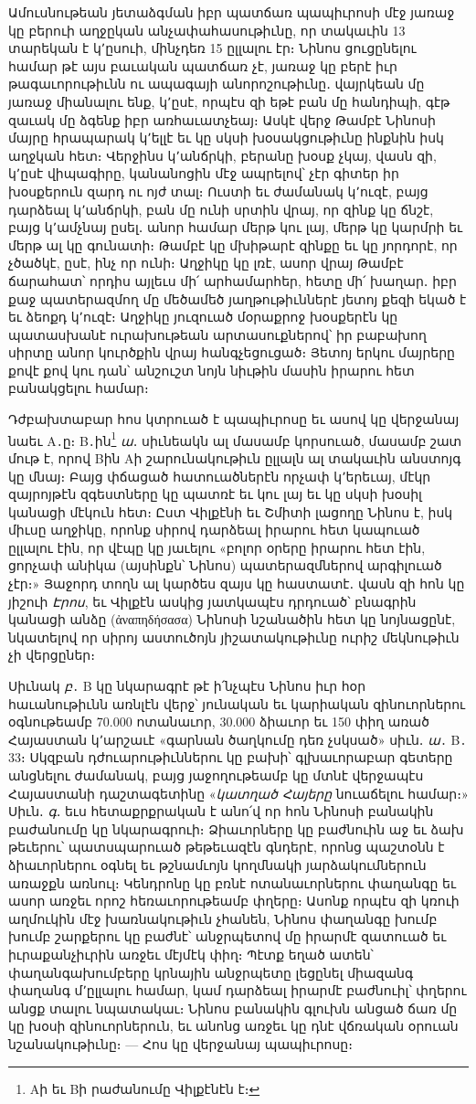 \documentclass{article}
\begin{document}
{Ամուսնութեան յետաձգման իբր պատճառ պապիւրոսի մէջ յառաջ կը բերուի աղջըկան անչափահասութիւնը, որ տակաւին 13 տարեկան է կ՚ըսուի, մինչդեռ 15 ըլլալու էր։ Նինոս ցուցընելու համար թէ այս բաւական պատճառ չէ, յառաջ կը բերէ իւր թագաւորութիւնն ու ապագայի անորոշութիւնը․ վայրկեան մը յառաջ միանալու ենք, կ՚ըսէ, որպէս զի եթէ բան մը հանդիպի, գէթ զաւակ մը ձգենք իբր առհաւատչեայ։ Ասկէ վերջ Թամբէ Նինոսի մայրը հրապարակ կ՚ելլէ եւ կը սկսի խօսակցութիւնը ինքնին իսկ աղջկան հետ։ Վերջինս կ՚անճրկի, բերանը խօսք չկայ, վասն զի, կ՚ըսէ վիպագիրը, կանանոցին մէջ ապրելով՝ չէր գիտեր իր խօսքերուն զարդ ու ոյժ տալ։ Ուստի եւ ժամանակ կ՚ուզէ, բայց դարձեալ կ՚անճրկի, բան մը ունի սրտին վրայ, որ զինք կը ճնշէ, բայց կ՚ամչնայ ըսել․ անոր համար մերթ կու լայ, մերթ կը կարմրի եւ մերթ ալ կը գունատի։ Թամբէ կը մխիթարէ զինքը եւ կը յորդորէ, որ չծածկէ, ըսէ, ինչ որ ունի։ Աղջիկը կը լռէ, ասոր վրայ Թամբէ ճարահատ՝ որդիս այլեւս մի՛ արհամարհեր, հետը մի՛ խաղար․ իբր քաջ պատերազմող մը մեծամեծ յաղթութիւններէ յետոյ քեզի եկած է եւ ձեոքդ կ՚ուզէ։ Աղջիկը յուզուած մօրաքրոջ խօսքերէն կը պատասխանէ ուրախութեան արտասուքներով՝ իր բաբախող սիրտը անոր կուրծքին վրայ հանգչեցուցած։ Յետոյ երկու մայրերը քովէ քով կու դան՝ անշուշտ նոյն նիւթին մասին իրարու հետ բանակցելու համար։

Դժբախտաբար հոս կտրուած է պապիւրոսը եւ ասով կը վերջանայ նաեւ Α․ը։ Β․ին\footnote{Αի եւ Βի րաժանումը Վիլքէնէն է։} \emph{ա}․ սիւնեակն ալ մասամբ կորսուած, մասամբ շատ մութ է, որով Βին Αի շարունակութիւն ըլլալն ալ տակաւին անստոյգ կը մնայ։ Բայց փճացած հատուածներէն որչափ կ՚երեւայ, մէկր զայրոյթէն զգեստները կը պատռէ եւ կու լայ եւ կը սկսի խօսիլ կանացի մէկուն հետ։ Ըստ Վիլքէնի եւ Շմիտի լացողը Նինոս է, իսկ միւսը աղջիկը, որոնք սիրով դարձեալ իրարու հետ կապուած ըլլալու էին, որ վէպը կը յաւելու «բոլոր օրերը իրարու հետ էին, ցորչափ անիկա (այսինքն՝ Նինոս) պատերազմներով արգիլուած չէր։» Յաջորդ տողն ալ կարծես զայս կը հաստատէ․ վասն զի հոն կը յիշուի \emph{Էրոս}, եւ Վիլքէն ասկից յատկապէս դրդուած՝ բնագրին կանացի անձը (ἀναπηδήσασα) Նինոսի նշանածին հետ կը նոյնացընէ, նկատելով որ սիրոյ աստուծոյն յիշատակութիւնը ուրիշ մեկնութիւն չի վերցըներ։

Սիւնակ \emph{բ}․ Β կը նկարագրէ թէ ի՛նչպէս Նինոս իւր հօր հաւանութիւնն առնլէն վերջ՝ յունական եւ կարիական զինուորներու օգնութեամբ 70.000 ոտանաւոր, 30.000 ձիաւոր եւ 150 փիղ առած Հայաստան կ՚արշաւէ «գարնան ծաղկումը դեռ չսկսած» սիւն․ \emph{ա}․ Β․ 33։ Սկզբան դժուարութիւններու կը բախի՝ գլխաւորաբար գետերը անցնելու ժամանակ, բայց յաջողութեամբ կը մտնէ վերջապէս Հայաստանի դաշտագետինը «\emph{կատղած Հայերը} նուաճելու համար։» Սիւն․ \emph{գ}․ եւս հետաքրքրական է անո՛վ որ հոն Նինոսի բանակին բաժանումը կը նկարագրուի։ Ձիաւորները կը բաժնուին աջ եւ ձախ թեւերու՝ պատսպարուած թեթեւազէն գնդերէ, որոնց պաշտօնն է ձիաւորներու օգնել եւ թշնամւոյն կողմնակի յարձակումներուն առաջքն առնուլ։ Կենդրոնը կը բռնէ ոտանաւորներու փաղանգը եւ ասոր առջեւ որոշ հեռաւորութեամբ փղերը։ Ասոնք որպէս զի կռուի աղմուկին մէջ խառնակութիւն չհանեն, Նինոս փաղանգը խումբ խումբ շարքերու կը բաժնէ՝ անջրպետով մը իրարմէ զատուած եւ իւրաքանչիւրին առջեւ մէյմէկ փիղ։ Պէտք եղած ատեն՝ փաղանգախումբերը կրնային անջրպետը լեցընել միազանգ փաղանգ մ՚ըլլալու համար, կամ դարձեալ իրարմէ բաժնուիլ՝ փղերու անցք տալու նպատակաւ։ Նինոս բանակին գլուխն անցած ճառ մը կը խօսի զինուորներուն, եւ անոնց առջեւ կը դնէ վճռական օրուան նշանակութիւնը։ — Հոս կը վերջանայ պապիւրոսը։

}
\end{document}
